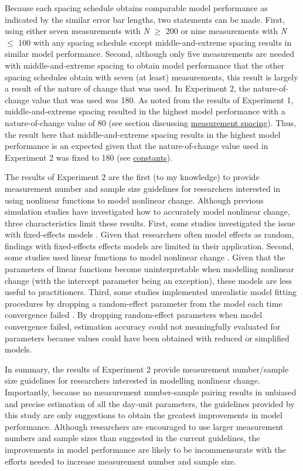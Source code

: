 \documentclass[
12pt, %
twoside,
english]{guelphthesis}
\begin{document}
\noindent Because each spacing schedule obtains comparable model performance as indicated by the similar error bar lengths, two statements can be made. First, using either seven measurements with \emph{N} \(\ge\) 200 or nine measurements with \emph{N} \(\le\) 100 with any spacing schedule except middle-and-extreme spacing results in similar model performance. Second, although only five measurements are needed with middle-and-extreme spacing to obtain model performance that the other spacing schedules obtain with seven (at least) measurements, this result is largely a result of the nature of change that was used. In Experiment 2, the nature-of-change value that was used was 180. As noted from the results of Experiment 1, middle-and-extreme spacing resulted in the highest model performance with a nature-of-change value of 80 (see section discussing \protect\hyperlink{meas-placing}{measurement spacing}). Thus, the result here that middle-and-extreme spacing results in the highest model performance is an expected given that the nature-of-change value used in Experiment 2 was fixed to 180 (see \protect\hyperlink{constants-exp2}{constants}).

The results of Experiment 2 are the first (to my knowledge) to provide measurement number and sample size guidelines for researchers interested in using nonlinear functions to model nonlinear change. Although previous simulation studies have investigated how to accurately model nonlinear change, three characteristics limit these results. First, some studies investigated the issue with fixed-effects models \autocite[e.g.,][]{finch2017}. Given that researchers often model effects as random, findings with fixed-effects effects models are limited in their application. Second, some studies used linear functions to model nonlinear change \autocites[e.g.,][]{fine2019,liu2022}. Given that the parameters of linear functions become uninterpretable when modelling nonlinear change (with the intercept parameter being an exception), these models are less useful to practitioners. Third, some studies implemented unrealistic model fitting procedures by dropping a random-effect parameter from the model each time convergence failed \autocite{finch2017}. By dropping random-effect parameters when model convergence failed, estimation accuracy could not meaningfully evaluated for parameters because values could have been obtained with reduced or simplified models.

In summary, the results of Experiment 2 provide measurement number/sample size guidelines for researchers interested in modelling nonlinear change. Importantly, because no measurement number-sample pairing results in unbiased and precise estimation of all the day-unit parameters, the guidelines provided by this study are only suggestions to obtain the greatest improvements in model performance. Although researchers are encouraged to use larger measurement numbers and sample sizes than suggested in the current guidelines, the improvements in model performance are likely to be incommensurate with the efforts needed to increase measurement number and sample size.
\end{document}

